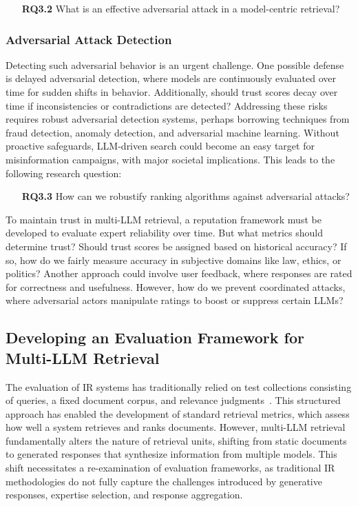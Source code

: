 \begin{itemize}
    \item [\textbf{RQ3.2}] What is an effective adversarial attack in a model-centric retrieval?
\end{itemize}

\subsubsection{Adversarial Attack Detection}

Detecting such adversarial behavior is an urgent challenge. One possible defense is delayed adversarial detection, where models are continuously evaluated over time for sudden shifts in behavior. Additionally, should trust scores decay over time if inconsistencies or contradictions are detected? Addressing these risks requires robust adversarial detection systems, perhaps borrowing techniques from fraud detection, anomaly detection, and adversarial machine learning. Without proactive safeguards, LLM-driven search could become an easy target for misinformation campaigns, with major societal implications. This leads to the following research question:

\begin{itemize}
    \item [\textbf{RQ3.3}] How can we robustify ranking algorithms against adversarial attacks?
\end{itemize}

To maintain trust in multi-LLM retrieval, a reputation framework must be developed to evaluate expert reliability over time. But what metrics should determine trust? Should trust scores be assigned based on historical accuracy? If so, how do we fairly measure accuracy in subjective domains like law, ethics, or politics? Another approach could involve user feedback, where responses are rated for correctness and usefulness. However, how do we prevent coordinated attacks, where adversarial actors manipulate ratings to boost or suppress certain LLMs? 

\subsection{Developing an Evaluation Framework for Multi-LLM Retrieval}

The evaluation of IR systems has traditionally relied on test collections consisting of queries, a fixed document corpus, and relevance judgments~\cite{Voorhees2001TREC, Robertson2008evaluation}. This structured approach has enabled the development of standard retrieval metrics, which assess how well a system retrieves and ranks documents. However, multi-LLM retrieval fundamentally alters the nature of retrieval units, shifting from static documents to generated responses that synthesize information from multiple models. This shift necessitates a re-examination of evaluation frameworks, as traditional IR methodologies do not fully capture the challenges introduced by generative responses, expertise selection, and response aggregation.

